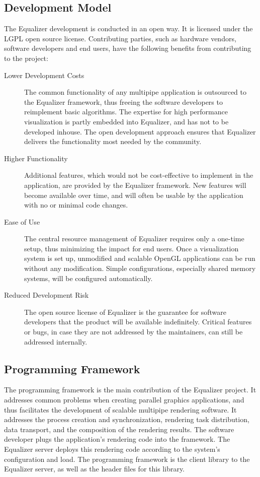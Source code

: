 \documentclass[10pt,a4paper]{scrartcl}
\begin{document}
\subsection{Development Model}

The Equalizer development is conducted in an open way. It is licensed
under the LGPL open source license. Contributing parties, such as
hardware vendors, software developers and end users, have the following
benefits from contributing to the project:

\begin{description}
\item[Lower Development Costs] The common functionality of any multipipe
  application is outsourced to the Equalizer framework, thus freeing the
  software developers to reimplement basic algorithms. The expertise for
  high performance visualization is partly embedded into Equalizer, and
  has not to be developed inhouse. The open development approach ensures
  that Equalizer delivers the functionality most needed by the community.
\item[Higher Functionality] Additional features, which would not be
  cost-effective to implement in the application, are provided by the
  Equalizer framework. New features will become available over time,
  and will often be usable by the application with no or minimal code
  changes.
\item[Ease of Use] The central resource management of Equalizer requires
  only a one-time setup, thus minimizing the impact for end users. Once
  a visualization system is set up, unmodified and scalable OpenGL
  applications can be run without any modification. Simple
  configurations, especially shared memory systems, will be configured
  automatically.
\item[Reduced Development Risk] The open source license of Equalizer is
  the guarantee for software developers that the product will be
  available indefinitely. Critical features or bugs, in case they are
  not addressed by the maintainers, can still be addressed internally.
\end{description}

\subsection{Programming Framework}

The programming framework is the main contribution of the
Equalizer project. It addresses common problems when creating parallel
graphics applications, and thus facilitates the development of scalable
multipipe rendering software. It addresses the process creation and
synchronization, rendering task distribution, data transport, and the
composition of the rendering results. The software developer plugs the
application's rendering code into the framework. The Equalizer server
deploys this rendering code according to the system's configuration and
load. The programming framework is the client library to the Equalizer
server, as well as the header files for this library.
\end{document}
